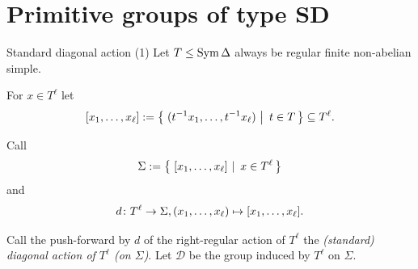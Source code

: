 \documentclass{beamer}
\theoremstyle{plain}
\theoremstyle{definition}
\begin{document}
%
%
%
%

\section{Primitive groups of type SD}


\begin{frame}{Standard diagonal action (1)}
Let $T \leq \operatorname{Sym} \Delta$ always be regular finite
non-abelian simple.

For $x \in T ^ \ell$ let
\[
    [x_1, \ldots, x_\ell]
    :=
     \left\{ \left.\, (t ^ {-1} x_1, \ldots, t ^ {-1} x_\ell) ~\right|~ t \in T \,\right\} 
    \subseteq T ^ \ell.
\]

Call
\[
    \Sigma
    :=
     \left\{ \left.\,  [x_1, \ldots, x_\ell]  ~\right|~  x \in T ^ \ell  \,\right\} 
\]
and
\[
    d \colon T ^ \ell \rightarrow \Sigma,
    (x_1, \ldots, x_\ell)
    \mapsto
    [x_1, \ldots, x_\ell].
\]

\pause
Call the push-forward by $d$
of the right-regular action of $T ^ \ell$
the \emph{(standard) diagonal action of $T ^ \ell$ (on $\Sigma$)}.
Let $\mathcal D$ be the group induced by $T ^ \ell$ on $\Sigma$.
\end{frame}
\end{document}

